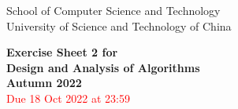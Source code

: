 \documentclass[a4paper,10pt]{article}
\begin{document}
\begin{minipage}[b]{0.58\textwidth}
	\large
	School of Computer Science and Technology\\University of Science and Technology of China
\end{minipage}

\hrulefill

\vspace{0.2cm}
\begin{center}
	{\large \bf Exercise Sheet 2 for \\[1mm]
		Design and Analysis of Algorithms\\[0.5mm]
		Autumn 2022}\\
	\textcolor{red}{Due 18 Oct 2022 at 23:59}
	\bigskip


\end{center}
\vspace{0.1cm}



\hrulefill\medskip


\newcommand{\Alg}{\ensuremath{\mathcal{A}}}
\end{document}
